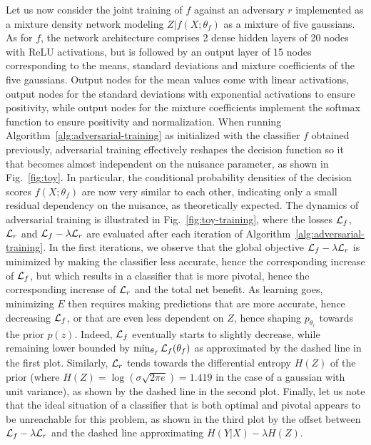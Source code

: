 \documentclass[twocolumn,superscriptaddress,aps]{revtex4-1}
\theoremstyle{plain}
\begin{document}
Let us now consider the joint training of $f$ against an adversary $r$
implemented as a mixture density network modeling $Z|f(X;\theta_f)$ as a mixture
of five gaussians. As for $f$, the network architecture comprises 2 dense hidden
layers of 20 nodes with ReLU activations, but is followed by an output layer of
15 nodes corresponding to the means, standard deviations and mixture
coefficients of the five gaussians. Output nodes for the mean values come with
linear activations, output nodes for the standard deviations with exponential
activations to ensure positivity, while output nodes for the mixture coefficients
implement the softmax function to ensure positivity and normalization. When
running Algorithm~\ref{alg:adversarial-training} as initialized with the
classifier $f$ obtained previously, adversarial training effectively reshapes
the decision function so it that becomes almost independent on the nuisance
parameter, as shown in Fig.~\ref{fig:toy}. In particular,
the conditional probability densities of the decision scores $f(X;\theta_f)$ are
now very similar to each other, indicating only a small residual  dependency on the
nuisance, as theoretically expected. The dynamics of adversarial training is
illustrated in Fig.~\ref{fig:toy-training}, where the losses ${\cal L}_f$,
${\cal L}_r$ and ${\cal L}_f - \lambda {\cal L}_r$ are evaluated after each
iteration of Algorithm~\ref{alg:adversarial-training}. In the first iterations,
we observe that the global objective ${\cal L}_f - \lambda {\cal L}_r$ is
minimized by making the classifier less accurate, hence the corresponding
increase of ${\cal L}_f$, but which results in a classifier that is more
pivotal, hence the corresponding increase of ${\cal L}_r$ and the total net
benefit. As learning goes, minimizing $E$ then requires making predictions that
are more accurate, hence decreasing ${\cal L}_f$, or that are even less dependent on
$Z$, hence shaping $p_{\theta_r}$ towards the prior $p(z)$. Indeed, ${\cal L}_f$
eventually starts to slightly decrease, while remaining lower bounded by
$\min_{\theta_f} {\cal L}_f(\theta_f)$ as approximated by the dashed line in the
first plot. Similarly,  ${\cal L}_r$ tends towards the differential entropy
$H(Z)$ of the prior (where $H(Z) = \log(\sigma \sqrt{2 \pi e}) = 1.419$ in the
case of a gaussian with unit variance), as shown by the dashed line in the
second plot.
Finally, let us note that the ideal situation of a
classifier that is both optimal and pivotal appears to be unreachable for this
problem, as shown in the third plot by the  offset between ${\cal L}_f - \lambda
{\cal L}_r$ and the dashed line approximating $H({Y|X}) -
\lambda H(Z)$.
\end{document}

